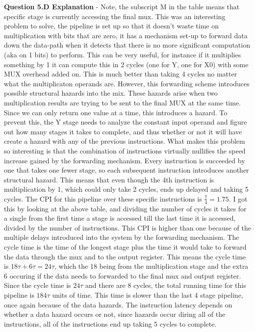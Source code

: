 \documentclass[a4paper,11pt]{article}
\begin{document}
\textbf{Question 5.D Explanation} - Note, the subscript M in the table means that specific stage is currently accessing the final mux. This was an interesting problem to solve, the pipeline is set up so that it doesn't waste time on multiplication with bits that are zero, it has a mechanism set-up to forward data down the data-path when it detects that there is no more significant computation (aka on 1 bits) to perform. This can be very useful, for instance if it multiplies something by 1 it can compute this in 2 cycles (one for Y, one for X0) with some MUX overhead added on. This is much better than taking 4 cycles no matter what the multiplicaton operands are. However, this forwarding scheme introduces possible structural hazards into the mix. These hazards arise when two multiplication results are trying to be sent to the final MUX at the same time. Since we can only return one value at a time, this introduces a hazard. To prevent this, the Y stage needs to analyze the constant input operand and figure out how many stages it takes to complete, and thus whether or not it will have create a hazard with any of the previous instructions. What makes this problem so interesting is that the combination of instructions virtually nullifies the speed increase gained by the forwarding mechanism. Every instruction is succeeded by one that takes one fewer stage, so each subsequent instruction introduces another structural hazard. This means that even though the 4th instruction is multiplication by 1, which could only take 2 cycles, ends up delayed and taking 5 cycles. The CPI for this pipeline over these specific instructions is $\frac{7}{4} = 1.75$. I got this by looking at the above table, and dividing the number of cycles it takes for a single from the first time a stage is accessed till the last time it is accessed, divided by the number of instructions. This CPI is higher than one because of the multiple delays introduced into the system by the forwarding mechanism. The cycle time is the time of the longest stage plus the time it would take to forward the data through the mux and to the output register. This means the cycle time is $18\tau + 6\tau = 24\tau$, which the 18 being from the multiplication stage and the extra 6 occuring if the data needs to forwarded to the final mux and output register. Since the cycle time is $24\tau$ and there are 8 cycles, the total running time for this pipeline is $184\tau$ units of time. This time is slower than the last 4 stage pipeline, once again because of the data hazards. The instruction latency depends on whether a data hazard occurs or not, since hazards occur diring all of the instructions, all of the instructions end up taking 5 cycles to complete. 
\end{document}
